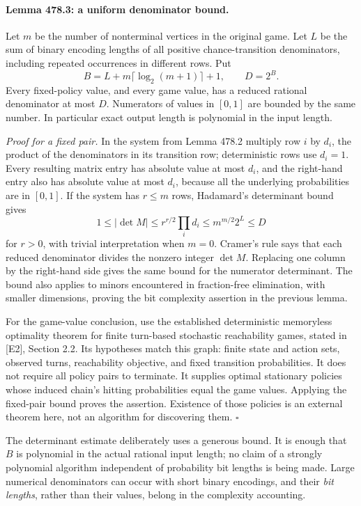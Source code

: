 \documentclass[11pt]{article}
\begin{document}
\paragraph{Lemma 478.3: a uniform denominator bound.}
Let $m$ be the number of nonterminal vertices in the original game. Let
$L$ be the sum of binary encoding lengths of all positive chance-transition
denominators, including repeated occurrences in different rows. Put
\begin{equation}\label{a478:denominator}
 B=L+m\lceil\log_2(m+1)\rceil+1,\qquad D=2^B.
\end{equation}
Every fixed-policy value, and every game value, has a reduced rational
denominator at most $D$. Numerators of values in $[0,1]$ are bounded by
the same number. In particular exact output length is polynomial in the
input length.

\emph{Proof for a fixed pair.} In the system from Lemma 478.2 multiply
row $i$ by $d_i$, the product of the denominators in its transition row;
deterministic rows use $d_i=1$. Every resulting matrix entry has absolute
value at most $d_i$, and the right-hand entry also has absolute value at
most $d_i$, because all the underlying probabilities are in $[0,1]$.
If the system has $r\leq m$ rows, Hadamard's determinant bound gives
\[
       1\leq|\det M|\leq r^{r/2}\prod_i d_i
                     \leq m^{m/2}2^L\leq D
\]
for $r>0$, with trivial interpretation when $m=0$. Cramer's rule says
that each reduced denominator divides the nonzero integer $\det M$.
Replacing one column by the right-hand side gives the same bound for
the numerator determinant. The bound also applies to minors encountered
in fraction-free elimination, with smaller dimensions, proving the bit
complexity assertion in the previous lemma.

For the game-value conclusion, use the established deterministic
memoryless optimality theorem for finite turn-based stochastic reachability
games, stated in [E2], Section 2.2. Its hypotheses match this graph:
finite state and action sets, observed turns, reachability objective, and
fixed transition probabilities. It does not require all policy pairs
to terminate. It supplies optimal stationary policies whose induced
chain's hitting probabilities equal the game values. Applying the
fixed-pair bound proves the assertion. Existence of those policies is an
external theorem here, not an algorithm for discovering them.
\hfill$\square$

The determinant estimate deliberately uses a generous bound. It is enough
that $B$ is polynomial in the actual rational input length; no claim of
a strongly polynomial algorithm independent of probability bit lengths
is being made. Large numerical denominators can occur with short binary
encodings, and their \emph{bit lengths}, rather than their values, belong
in the complexity accounting.
\end{document}
